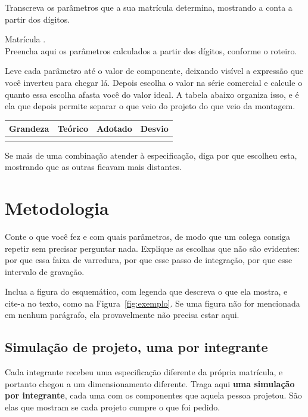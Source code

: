 \documentclass[11pt,a4paper]{article}
\begin{document}
Transcreva os parâmetros que a sua matrícula determina, mostrando a conta a partir dos
dígitos.

\begin{espec}
Matrícula . \\
Preencha aqui os parâmetros calculados a partir dos dígitos, conforme o roteiro.
\end{espec}

Leve cada parâmetro até o valor de componente, deixando visível a expressão que você
inverteu para chegar lá. Depois escolha o valor na série comercial e calcule o quanto essa
escolha afasta você do valor ideal. A tabela abaixo organiza isso, e é ela que depois
permite separar o que veio do projeto do que veio da montagem.

\begin{center}
\begin{tabular}{@{}lrrr@{}}
\toprule
\textbf{Grandeza} & \textbf{Teórico} & \textbf{Adotado} & \textbf{Desvio} \\
\midrule
& & & \\
\bottomrule
\end{tabular}
\end{center}

Se mais de uma combinação atender à especificação, diga por que escolheu esta, mostrando
que as outras ficavam mais distantes.

\section{Metodologia}

Conte o que você fez e com quais parâmetros, de modo que um colega consiga repetir sem
precisar perguntar nada. Explique as escolhas que não são evidentes: por que essa faixa de
varredura, por que esse passo de integração, por que esse intervalo de gravação.

Inclua a figura do esquemático, com legenda que descreva o que ela mostra, e cite-a no
texto, como na Figura~\ref{fig:exemplo}. Se uma figura não for mencionada em nenhum
parágrafo, ela provavelmente não precisa estar aqui.

\subsection{Simulação de projeto, uma por integrante}

Cada integrante recebeu uma especificação diferente da própria matrícula, e portanto chegou
a um dimensionamento diferente. Traga aqui \textbf{uma simulação por integrante}, cada uma
com os componentes que aquela pessoa projetou. São elas que mostram se cada projeto cumpre
o que foi pedido.
\end{document}
